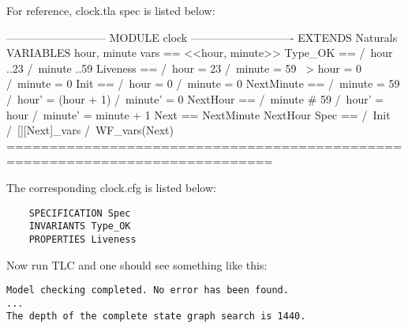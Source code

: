 \documentclass{report}
\begin{document}
For reference, clock.tla spec is listed below:

\begin{tla}
--------------------------- MODULE clock ----------------------------
EXTENDS Naturals
VARIABLES hour, minute
vars == <<hour, minute>>
Type_OK == 
    /\ hour ..23
    /\ minute ..59
Liveness ==
    /\ hour = 23 /\ minute = 59 ~> hour = 0 /\ minute = 0
Init ==
    /\ hour = 0
    /\ minute = 0
NextMinute ==
    /\ minute = 59 
    /\ hour' = (hour + 1) %
    /\ minute' = 0
NextHour == 
    /\ minute # 59
    /\ hour' = hour 
    /\ minute' = minute + 1 
Next ==
    \/ NextMinute
    \/ NextHour
Spec ==
  /\ Init
  /\ [][Next]_vars
  /\ WF_vars(Next)
=============================================================================
\end{tla}
\begin{tlatex}
\@x{}\moduleLeftDash{}\moduleRightDash\@xx{}%
%
%
%
%
%
%
%
%
%
%
%
%
%
%
%
%
%
%
%
%
%
%
%
%
%
\@x{}\bottombar\@xx{}%
\end{tlatex}

The corresponding clock.cfg is listed below: 
\begin{lstlisting}
    SPECIFICATION Spec
    INVARIANTS Type_OK
    PROPERTIES Liveness
\end{lstlisting}

Now run TLC and one should see something like this: 
\begin{lstlisting}
Model checking completed. No error has been found.
...
The depth of the complete state graph search is 1440.
\end{lstlisting}
\end{document}

